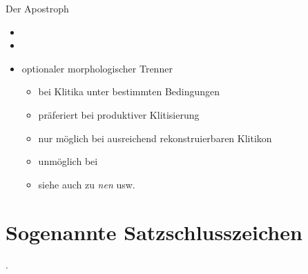 \begin{frame}
  {Der Apostroph}
  \onslide<+->
  \begin{itemize}[<+->]
    \item {}
    \item {}
      \Zeile
    \item optionaler \alert{morphologischer Trenner}
      \begin{itemize}[<+->]
        \item bei \alert{Klitika unter bestimmten Bedingungen}
          \Viertelzeile
        \item präferiert bei \alert{produktiver Klitisierung}
        \item nur möglich bei \alert{ausreichend rekonstruierbaren Klitikon}
        \item unmöglich bei 
          \Zeile
        \item siehe auch \citet{SchaeferSayatz2014} zu \textit{nen} usw.
      \end{itemize}
  \end{itemize}
\end{frame}


\section[Satzschluss]{Sogenannte Satzschlusszeichen}

\begin{frame}
  {.}
  \onslide<+->
  \onslide<+->
  \begin{exe}
    \ex
    \begin{xlist}
    \end{xlist}
    \ex
    \begin{xlist}
    \end{xlist}
    \ex
    \begin{xlist}
    \end{xlist}
  \end{exe}
\end{frame}

